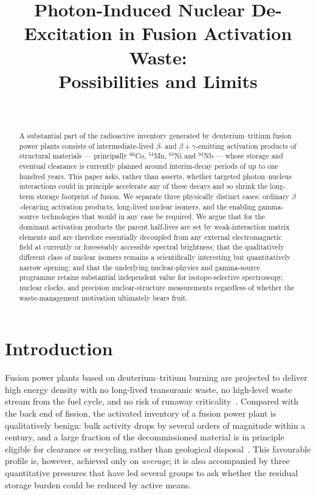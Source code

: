 \documentclass[conference]{IEEEtran}
\title{Photon-Induced Nuclear De-Excitation in Fusion Activation Waste:\\
Possibilities and Limits}
\author{\IEEEauthorblockN{Martino}\\
\IEEEauthorblockA{Draft research outline}}
\begin{document}
\maketitle

\begin{abstract}
A substantial part of the radioactive inventory generated by deuterium--tritium fusion power plants consists of intermediate-lived $\beta$- and $\beta+\gamma$-emitting activation products of structural materials --- principally $^{60}$Co, $^{54}$Mn, $^{63}$Ni and $^{94}$Nb --- whose storage and eventual clearance is currently planned around interim-decay periods of up to one hundred years. This paper asks, rather than asserts, whether targeted photon--nucleus interactions could in principle accelerate any of these decays and so shrink the long-term storage footprint of fusion. We separate three physically distinct cases: ordinary $\beta$-decaying activation products, long-lived nuclear isomers, and the enabling gamma-source technologies that would in any case be required. We argue that for the dominant activation products the parent half-lives are set by weak-interaction matrix elements and are therefore essentially decoupled from any external electromagnetic field at currently or foreseeably accessible spectral brightness; that the qualitatively different class of nuclear isomers remains a scientifically interesting but quantitatively narrow opening; and that the underlying nuclear-physics and gamma-source programme retains substantial independent value for isotope-selective spectroscopy, nuclear clocks, and precision nuclear-structure measurements regardless of whether the waste-management motivation ultimately bears fruit.
\end{abstract}

\section{Introduction}
Fusion power plants based on deuterium--tritium burning are projected to deliver high energy density with no long-lived transuranic waste, no high-level waste stream from the fuel cycle, and no risk of runaway criticality~\cite{maisonnier2007demo,gonzalez2022overview}. Compared with the back end of fission, the activated inventory of a fusion power plant is qualitatively benign: bulk activity drops by several orders of magnitude within a century, and a large fraction of the decommissioned material is in principle eligible for clearance or recycling rather than geological disposal~\cite{dipace2012radwaste,zucchetti2019progress}. This favourable profile is, however, achieved only on \emph{average}; it is also accompanied by three quantitative pressures that have led several groups to ask whether the residual storage burden could be reduced by active means.
\end{document}

